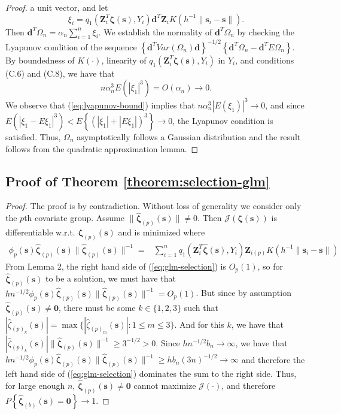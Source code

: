 \documentclass[authoryear,review, 12pt]{elsarticle}
\begin{document}
\begin{proof}
a unit vector, and let
\[
\xi_{i}=q_{1}\left(\bm{Z}_{i}^{T}\bm{\zeta}(\bm{s}),Y_{i}\right)\bm{d}^{T}\bm{Z}_{i}K\left(h^{-1}\|\bm{s}_{i}-\bm{s}\|\right).
\]
Then $\bm{d}^{T}\Omega_{n}=\alpha_{n}\sum_{i=1}^{n}\xi_{i}$. We establish
the normality of $\bm{d}^{T}\Omega_{n}$ by checking the Lyapunov
condition of the sequence $\left\{ \bm{d}^{T}Var\left(\Omega_{n}\right)\bm{d}\right\} ^{-1/2}\left\{ \bm{d}^{T}\Omega_{n}-\bm{d}^{T}E\Omega_{n}\right\} $.
By boundedness of $K\left(\cdot\right)$, linearity of $q_{1}\left(\bm{Z}_{i}^{T}\bm{\zeta}(\bm{s}),Y_{i}\right)$
in $Y_{i}$, and conditions (C.6) and (C.8), we have that
\begin{equation}
n\alpha_{n}^{3}E\left(\left|\xi_{1}\right|^{3}\right)=O\left(\alpha_{n}\right)\to0.\label{eq:lyapunov-bound}
\end{equation}
We observe that (\ref{eq:lyapunov-bound}) implies that $n\alpha_{n}^{3}\left|E\left(\xi_{1}\right)\right|^{3}\to0$,
and since $E\left(\left|\xi_{1}-E\xi_{1}\right|^{3}\right)<E\left\{ \left(\left|\xi_{1}\right|+\left|E\xi_{1}\right|\right)^{3}\right\} \to0$,
the Lyapunov condition is satisfied. Thus, $\Omega_{n}$ asymptotically
follows a Gaussian distribution and the result follows from the quadratic
approximation lemma.
\end{proof}
\subsection*{Proof of Theorem \ref{theorem:selection-glm}}
\begin{proof}
The proof is by contradiction. Without loss of generality we consider
only the $p$th covariate group.
Assume $\|\hat{\bm{\zeta}}_{(p)}(\bm{s})\|\ne0$. Then $\mathcal{J}\left(\bm{\zeta}(\bm{s})\right)$
is differentiable w.r.t. $\bm{\zeta}_{(p)}(\bm{s})$ and is minimized
where 
\begin{align}
\phi_{p}(\bm{s})\hat{\bm{\zeta}}_{(p)}(\bm{s})\|\hat{\bm{\zeta}}_{(p)}(\bm{s})\|^{-1}= & \sum_{i=1}^{n}q_{1}\!\left(\bm{Z}_{i}^{T}\hat{\bm{\zeta}}(\bm{s}),Y_{i}\right)\bm{Z}_{i(p)}K\left(h^{-1}\|\bm{s}_{i}-\bm{s}\|\right)\label{eq:glm-selection}
\end{align}
From Lemma 2, the right hand side of (\ref{eq:glm-selection})
is $O_{p}\left(1\right)$, so for $\hat{\bm{\zeta}}_{(p)}(\bm{s})$
to be a solution, we must have that $hn^{-1/2}\phi_{p}(\bm{s})\hat{\bm{\zeta}}_{(p)}(\bm{s})\|\hat{\bm{\zeta}}_{(p)}(\bm{s})\|^{-1}=O_{p}\left(1\right)$.
But since by assumption $\hat{\bm{\zeta}}_{(p)}(\bm{s})\ne\bm{0}$,
there must be some $k\in\{1,2,3\}$ such that $|\hat{\zeta}_{(p)_{k}}(\bm{s})|=\max\{|\hat{\zeta}_{(p)_{m}}(\bm{s})|:1\le m\le3\}$.
And for this $k$, we have that $|\hat{\zeta}_{(p)_{k}}(\bm{s})|\|\hat{\bm{\zeta}}_{(p)}(\bm{s})\|^{-1}\ge3^{-1/2}>0$.
Since $hn^{-1/2}b_{n}\to\infty$, we have that $hn^{-1/2}\phi_{p}(\bm{s})\hat{\bm{\zeta}}_{(p)}(\bm{s})\|\hat{\bm{\zeta}}_{(p)}(\bm{s})\|^{-1}\ge hb_{n}(3n)^{-1/2}\to\infty$
and therefore the left hand side of (\ref{eq:glm-selection}) dominates
the sum to the right side. Thus, for large enough $n$, $\hat{\bm{\zeta}}_{(p)}(\bm{s})\ne\bm{0}$
cannot maximize $\mathcal{J}\left(\cdot\right)$, and therefore $P\left\{ \hat{\bm{\zeta}}_{(b)}(\bm{s})=\bm{0}\right\} \to1$. 
\end{proof}
\end{document}
